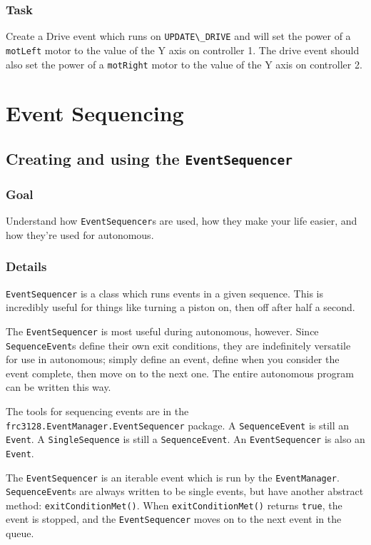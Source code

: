 \documentclass[a4paper]{article}
\begin{document}
\subsubsection{Task} Create a Drive event which runs on \lstinline{UPDATE\_DRIVE} and will set the power of a \lstinline{motLeft} motor to the value of the Y axis on controller 1. The drive event should also set the power of a \lstinline{motRight} motor to the value of the Y axis on controller 2.


\pagebreak\section{Event Sequencing}\setcounter{subsection}{21}

\subsection{Creating and using the \lstinline{EventSequencer}}
\subsubsection{Goal} Understand how \lstinline{EventSequencer}s are used, how they make your life easier, and how they're used for autonomous.
\subsubsection{Details} \lstinline{EventSequencer} is a class which runs events in a given sequence. This is incredibly useful for things like turning a piston on, then off after half a second.

The \lstinline{EventSequencer} is most useful during autonomous, however. Since \lstinline{SequenceEvent}s define their own exit conditions, they are indefinitely versatile for use in autonomous; simply define an event, define when you consider the event complete, then move on to the next one. The entire autonomous program can be written this way. 

The tools for sequencing events are in the \lstinline{frc3128.EventManager.EventSequencer} package. A \lstinline{SequenceEvent} is still an \lstinline{Event}. A \lstinline{SingleSequence} is still a \lstinline{SequenceEvent}. An \lstinline{EventSequencer} is also an \lstinline{Event}.

The \lstinline{EventSequencer} is an iterable event which is run by the \lstinline{EventManager}. \lstinline{SequenceEvent}s are always written to be single events, but have another abstract method: \lstinline{exitConditionMet()}. When \lstinline{exitConditionMet()} returns \lstinline{true}, the event is stopped, and the \lstinline{EventSequencer} moves on to the next event in the queue.
\end{document}
